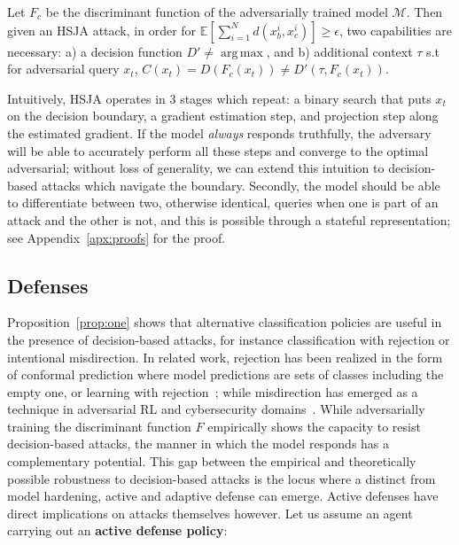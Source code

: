 \begin{proposition}
Let $F_c$ be the discriminant function of the adversarially trained model $\mathcal{M}$. Then given an HSJA attack, in order for $\mathbb{E}[\sum_{i=1}^{N}d(x^i_b,x^i_c)] \geq \epsilon$, two capabilities are necessary: a) a decision function $D' \neq \operatorname*{arg\,max}$, and b) additional context $\tau$ s.t for adversarial query $x_t$, $C(x_t) = D(F_c(x_t)) \neq D'(\tau, F_c(x_t))$.
\label{prop:one}
\end{proposition}

Intuitively, HSJA operates in 3 stages which repeat: a binary search that puts $x_t$ on the decision boundary, a gradient estimation step, and projection step along the estimated gradient.
If the model \emph{always} responds truthfully, the adversary will be able to accurately perform all these steps and converge to the optimal adversarial; without loss of generality, we can extend this intuition to decision-based attacks which navigate the boundary.
Secondly, the model should be able to differentiate between two, otherwise identical, queries when one is part of an attack and the other is not, and this is possible through a stateful representation; see Appendix~\ref{apx:proofs} for the proof.

\subsection{Defenses}

Proposition~\ref{prop:one} shows that alternative classification policies are useful in the presence of decision-based attacks, for instance classification with rejection or intentional misdirection.
In related work, rejection has been realized in the form of conformal prediction where model predictions are sets of classes including the empty one, or learning with rejection~\cite{barbero2022transcending, cortes2016learning}; while misdirection has emerged as a technique in adversarial RL and cybersecurity domains~\cite{gleave2020adversarial, sengupta2020multi}.
While adversarially training the discriminant function $F$ empirically shows the capacity to resist decision-based attacks, the manner in which the model responds has a complementary potential.
This gap between the empirical and theoretically possible robustness to decision-based attacks is the locus where a distinct from model hardening, active and adaptive defense can emerge.
Active defenses have direct implications on attacks themselves however.
Let us assume an agent carrying out an \textbf{active defense policy}:

